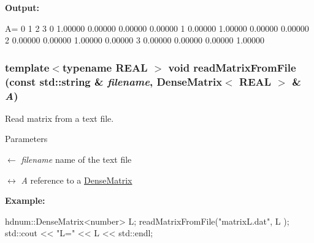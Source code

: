 {\bfseries Output:} \begin{DoxyVerb}
A=
                      0          1          2          3 
          0     1.00000    0.00000    0.00000    0.00000 
          1     0.00000    1.00000    0.00000    0.00000 
          2     0.00000    0.00000    1.00000    0.00000 
          3     0.00000    0.00000    0.00000    1.00000 
	\end{DoxyVerb}
 \hypertarget{classhdnum_1_1DenseMatrix_a5c106d0beabd399734dd2b1a6637626e}{
\subsubsection[{readMatrixFromFile}]{\setlength{\rightskip}{0pt plus 5cm}template$<$typename REAL $>$ void readMatrixFromFile (const std::string \& {\em filename}, \/  {\bf DenseMatrix}$<$ REAL $>$ \& {\em A})}}
\label{classhdnum_1_1DenseMatrix_a5c106d0beabd399734dd2b1a6637626e}


Read matrix from a text file. 


\begin{DoxyParams}{Parameters}
\item[\mbox{$\leftarrow$} {\em filename}]name of the text file \item[\mbox{$\leftrightarrow$} {\em A}]reference to a \hyperlink{classhdnum_1_1DenseMatrix}{DenseMatrix}\end{DoxyParams}
{\bfseries Example:} 
\begin{DoxyCode}
hdnum::DenseMatrix<number> L;
readMatrixFromFile("matrixL.dat", L );
std::cout << "L=" << L << std::endl;
\end{DoxyCode}


